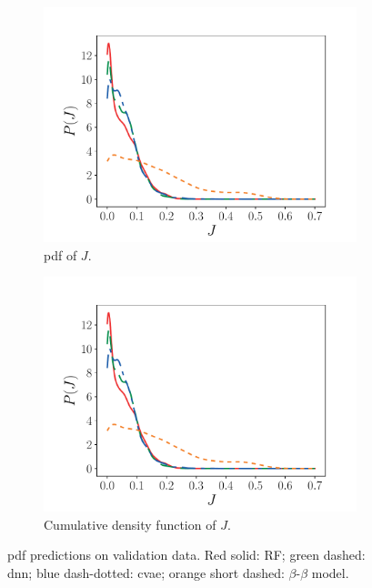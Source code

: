 \documentclass[review]{elsarticle}
\begin{document}
\begin{figure}[!tbp]%
  \centering%
  \begin{subfigure}[t]{0.48\textwidth}%
    \includegraphics[page=1,width=\textwidth, trim=0.5cm 0cm 1.5cm 1.3cm, clip=true]{./figs/jsd_dice_0004.pdf}%
    \caption{\Gls{pdf} of $J$.}\label{fig:jsd_pdf}%
  \end{subfigure}\hfill%
  \begin{subfigure}[t]{0.48\textwidth}%
    \includegraphics[page=2,width=\textwidth, trim=0.5cm 0cm 1.5cm 1.3cm, clip=true]{./figs/jsd_dice_0004.pdf}%
    \caption{Cumulative density function of $J$.}\label{fig:jsd_cdf}%
  \end{subfigure}%
  \caption{\Gls{pdf} predictions on validation data. Red solid: RF; green dashed: \gls{dnn}; blue dash-dotted: \gls{cvae}; orange short dashed: $\beta$-$\beta$ model.}\label{fig:jsd}%
\end{figure}%
\end{document}
